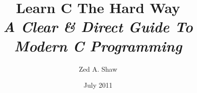 


\title{
    Learn C The Hard Way\\
    \textit{A Clear \& Direct Guide To Modern C Programming}
}
\author{Zed A. Shaw}
\date{July 2011}



\frontmatter

\maketitle

\tableofcontents



\mainmatter



\appendix



